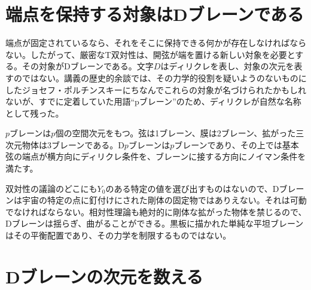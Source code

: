 \begin{classroomqa}
\end{classroomqa}

\section{端点を保持する対象はDブレーンである}

端点が固定されているなら、それをそこに保持できる何かが存在しなければならない。したがって、厳密なT双対性は、開弦が端を置ける新しい対象を必要とする。その対象がDブレーンである。文字\(D\)はディリクレを表し、対象の次元を表すのではない。講義の歴史的余談では、その力学的役割を疑いようのないものにしたジョセフ・ポルチンスキーにちなんでこれらの対象が名づけられたかもしれないが、すでに定着していた用語``pブレーン''のため、ディリクレが自然な名称として残った。

\(p\)ブレーンは\(p\)個の空間次元をもつ。弦は1ブレーン、膜は2ブレーン、拡がった三次元物体は3ブレーンである。D\(p\)ブレーンは\(p\)ブレーンであり、その上では基本弦の端点が横方向にディリクレ条件を、ブレーンに接する方向にノイマン条件を満たす。

双対性の議論のどこにも\(Y_0\)のある特定の値を選び出すものはないので、Dブレーンは宇宙の特定の点に釘付けにされた剛体の固定物ではありえない。それは可動でなければならない。相対性理論も絶対的に剛体な拡がった物体を禁じるので、Dブレーンは揺らぎ、曲がることができる。黒板に描かれた単純な平坦ブレーンはその平衡配置であり、その力学を制限するものではない。

\begin{classroomqa}
\end{classroomqa}

\section{Dブレーンの次元を数える}

